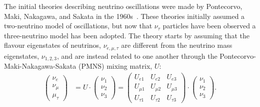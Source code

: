 The initial theories describing neutrino oscillations were made by Pontecorvo, Maki, Nakagawa, and Sakata in the 1960s~\cite{makiRemarksUnifiedModel1962,pontecorvoNeutrinoExperimentsProblem1968}. %
These theories initially assumed a two-neutrino model of oscillations, but now that $\nu_{\tau}$ particles have been observed a three-neutrino model has been adopted. The theory starts by assuming that the flavour eigenstates of neutrinos, $\nu_{e,\mu,\tau}$ are different from the neutrino mass eigenstates, $\nu_{1,2,3}$, and are instead related to one another through the Pontecorvo-Maki-Nakagawa-Sakata (PMNS) mixing matrix, $U$:
\begin{align}
    \begin{pmatrix}
        \nu_{e} \\ \nu_{\mu} \\ \mu_{\tau}
    \end{pmatrix}
     &= U \cdot 
     \begin{pmatrix}
        \nu_{1} \\ \nu_{2} \\ \nu_{3}
    \end{pmatrix}
     = \begin{pmatrix}
        U_{e1} & U_{e2} & U_{e3} \\
        U_{\mu1} & U_{\mu2} & U_{\mu3} \\
        U_{\tau1} & U_{\tau2} & U_{\tau3} 
    \end{pmatrix} \cdot 
     \begin{pmatrix}
        \nu_{1} \\ \nu_{2} \\ \nu_{3}
    \end{pmatrix}.
\end{align}

